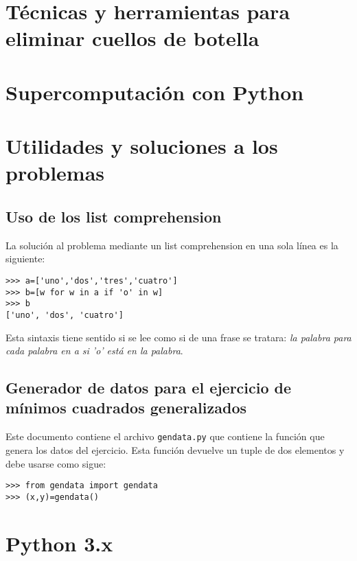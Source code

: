 \documentclass[a4paper,10pt]{article}
\begin{document}
\section{Técnicas y herramientas para eliminar cuellos de botella}

\section{Supercomputación con Python}

\appendix

\section{Utilidades y soluciones a los problemas}

\subsection{Uso de los list comprehension}

La solución al problema mediante un list comprehension en una sola
línea es la siguiente:

\begin{lstlisting}
>>> a=['uno','dos','tres','cuatro']
>>> b=[w for w in a if 'o' in w]
>>> b
['uno', 'dos', 'cuatro']
\end{lstlisting}

Esta sintaxis tiene sentido si se lee como si de una frase se tratara:
\emph{la palabra para cada palabra en a si 'o' está en la palabra}.

\subsection{Generador de datos para el ejercicio de mínimos cuadrados
  generalizados}\label{sec:mcg}


Este documento contiene el archivo \texttt{gendata.py} que contiene la
función que genera los datos del ejercicio. Esta función devuelve un
tuple de dos elementos y debe usarse como sigue:

\begin{lstlisting}
>>> from gendata import gendata
>>> (x,y)=gendata()
\end{lstlisting}

\section{Python 3.x}
\end{document}
